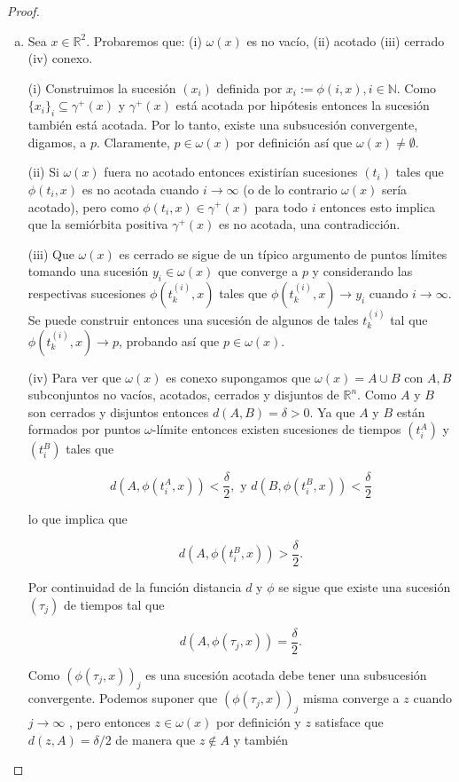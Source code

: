 \documentclass[11pt]{book}
\theoremstyle{definition}
\numberwithin{definition}{section}
\theoremstyle{theorem}
\numberwithin{theorem}{section}
\numberwithin{lemma}{section}
\numberwithin{corollary}{section}
\theoremstyle{plain}
\numberwithin{example}{section}
\newcommand{\N}{{\ensuremath{\mathbb{N}}}}
\newcommand{\R}{{\ensuremath{\mathbb{R}}}}
\begin{document}
\begin{proof}
\begin{enumerate}[(a)]
	\item Sea $x \in \R^2$. Probaremos que: (i) $\omega(x)$ es no vacío, (ii) acotado (iii) cerrado (iv) conexo.

	(i) Construimos la sucesión $(x_i)$ definida por $ x_i:= \phi(i, x), i \in \N$. Como $\{x_i\}_i \subseteq \gamma^+(x)$ y $\gamma^+(x)$ está acotada por hipótesis entonces la sucesión también está acotada. Por lo tanto, existe una subsucesión convergente, digamos, a $p$. Claramente, $p \in \omega(x)$ por definición así que $\omega(x) \neq \emptyset$.

	(ii) Si $\omega(x)$ fuera no acotado entonces existirían sucesiones $(t_i)$ tales que $\phi(t_i, x)$ es no acotada cuando $i \to \infty$ (o de lo contrario $\omega(x)$ sería acotado), pero como $\phi(t_i, x) \in \gamma^+(x)$ para todo $i$ entonces esto implica que la semiórbita positiva $\gamma^+(x)$ es no acotada, una contradicción.

	(iii) Que $\omega(x)$ es cerrado se sigue de un típico argumento de puntos límites tomando una sucesión $y_i \in \omega(x)$ que converge a $p$ y considerando las respectivas sucesiones $\phi(t_k^{(i)}, x)$ tales que $\phi(t_k^{(i)}, x) \to y_i$ cuando $i \to \infty$. Se puede construir entonces una sucesión de algunos de tales $t_k^{(i)}$ tal que $\phi(t_k^{(i)}, x) \to p$, probando así que $p \in \omega(x)$.

	(iv) Para ver que $\omega(x)$ es conexo supongamos que $\omega(x) = A \cup B$ con $A,B$ subconjuntos no vacíos, acotados, cerrados y disjuntos de $\R^n$.
	Como $A$ y $B$ son cerrados y disjuntos entonces $d(A,B) = \delta > 0$. Ya que $A$ y $B$ están formados por puntos $\omega$-límite entonces existen sucesiones de tiempos $(t_i^A)$ y $(t_i^B)$ tales que

$$ d(A, \phi(t_i^A, x)) < \frac{\delta}{2}, \text{ y } d(B, \phi(t_i^B, x)) < \frac{\delta}{2}$$

lo que implica que

$$ d(A, \phi(t_i^B, x)) > \frac{\delta}{2}. $$

Por continuidad de la función distancia $d$ y $\phi$ se sigue que existe una sucesión $(\tau_j)$ de tiempos tal que

$$ d(A, \phi(\tau_j, x)) = \frac{\delta}{2}. $$

Como $(\phi(\tau_j, x))_j$ es una sucesión acotada debe tener una subsucesión convergente. Podemos suponer que $(\phi(\tau_j, x))_j$ misma converge a $z$ cuando $j \to \infty$ , pero entonces $z \in \omega(x)$ por definición y $z$ satisface que $d(z,A) = \delta/2$ de manera que $z \notin A$ y también


\end{enumerate}
\end{proof}
\end{document}
